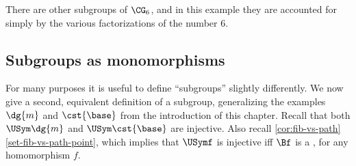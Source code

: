 There are other subgroups of $\CG_6$, and in this example they are accounted for simply by the various factorizations of the number $6$.

\subsection{Subgroups as monomorphisms}




For many purposes it is useful to define ``subgroups'' slightly differently.
We now give a second, equivalent definition of a subgroup,
generalizing the examples $\dg{m}$ and $\cst{\base}$ from
the introduction of this chapter. Recall that both
$\USym\dg{m}$ and $\USym\cst{\base}$ are injective.
Also recall \cref{cor:fib-vs-path}\ref{set-fib-vs-path-point},
which implies that $\USymf$ is injective iff $\Bf$ is a \covering,
for any homomorphism $f$.

